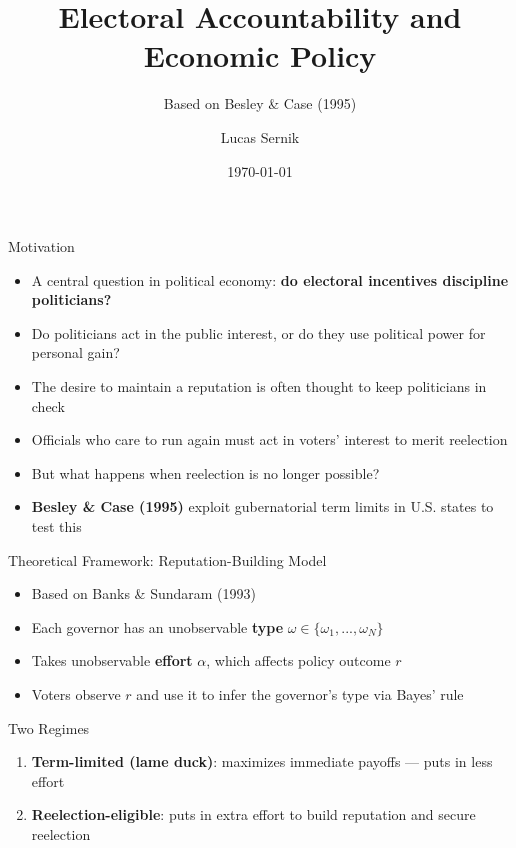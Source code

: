 \documentclass{beamer}
\title[Electoral Accountability]{Electoral Accountability and Economic Policy}
\subtitle{Based on Besley \& Case (1995)}
\author{Lucas Sernik}
\date{\today}
\begin{document}
\begin{frame}
\titlepage
\end{frame}

\begin{frame}{Motivation}
\begin{itemize}
    \item A central question in political economy: \textbf{do electoral incentives discipline politicians?}
    \vspace{0.3em}
    \item Do politicians act in the public interest, or do they use political power for personal gain?
    \vspace{0.3em}
    \item The desire to maintain a reputation is often thought to keep politicians in check
    \vspace{0.3em}
    \item Officials who care to run again must act in voters' interest to merit reelection
    \vspace{0.3em}
    \item But what happens when reelection is no longer possible?
    \vspace{0.3em}
    \item \textbf{Besley \& Case (1995)} exploit gubernatorial term limits in U.S. states to test this
\end{itemize}
\end{frame}

\begin{frame}{Theoretical Framework: Reputation-Building Model}
\begin{itemize}
    \item Based on Banks \& Sundaram (1993)
    \vspace{0.5em}
    \item Each governor has an unobservable \textbf{type} $\omega \in \{\omega_1, ..., \omega_N\}$
    \vspace{0.5em}
    \item Takes unobservable \textbf{effort} $\alpha$, which affects policy outcome $r$
    \vspace{0.5em}
    \item Voters observe $r$ and use it to infer the governor's type via Bayes' rule
\end{itemize}
\vspace{0.5em}
\begin{block}{Two Regimes}
\begin{enumerate}
    \item \textbf{Term-limited (lame duck)}: maximizes immediate payoffs --- puts in less effort
    \item \textbf{Reelection-eligible}: puts in extra effort to build reputation and secure reelection
\end{enumerate}
\end{block}
\end{frame}
\end{document}

